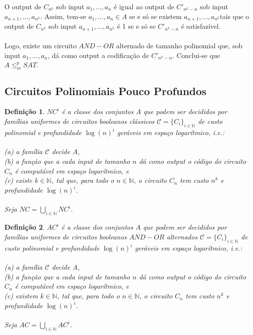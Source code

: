 \documentclass[10pt,a4paper]{report}
\newtheorem{definition}{Definição}
\begin{document}
O output de $C_{n^k}$ sob input $a_1, ..., a_n$ é igual ao output de $C'_{n^k-n}$ sob input $a_{n+1}, ..., a_{n^k}$. Assim, tem-se $a_1, ..., a_n \in A$ se e só se existem $a_{n+1}, ..., a_{n^k}$tais que o output de $C_{n^k}$ sob input $a_{n+1}, ..., a_{n^k}$ é 1 se e só se $C'_{n^k-n}$ é satisfazível.\\
\\
Logo, existe um circuito $AND-OR$ alternado de tamanho polinomial que, sob input $a_1, ..., a_n$, dá como output a codificação de $C'_{n^k-n}$. Conclui-se que $A \leq^p_m SAT$.
\subsection{Circuitos Polinomiais Pouco Profundos}
\begin{definition}
$NC^i$ é a classe dos conjuntos $A$ que podem ser decididos por famílias uniformes de circuitos booleanos clássicos $\mathcal{C} = \{C_i\}_{i\in\mathbb{N}}$ de custo polinomial e profundidade $\log (n)^i$ geráveis em espaço logarítmico, i.e.:\\
\\
(a) a família $\mathcal{C}$ decide $A$, \\
(b) a função que a cada input de tamanho $n$ dá como output o código do circuito $C_n$ é computável em espaço logarítmico, e\\
(c) existe $k \in \mathbb{N}$, tal que, para todo o $n \in \mathbb{N}$, o circuito $C_n$ tem custo $n^k$ e profundidade $\log (n)^i$.\\
\\
Seja $NC = \bigcup_{i \in \mathbb{N}} NC^i$.
\end{definition}
\begin{definition}
$AC^i$ é a classe dos conjuntos $A$ que podem ser decididos por famílias uniformes de circuitos booleanos $AND-OR$ alternados $\mathcal{C} = \{C_i\}_{i\in\mathbb{N}}$ de custo polinomial e profundidade $\log (n)^i$ geráveis em espaço logarítmico, i.e.:\\
\\
(a) a família $\mathcal{C}$ decide A,\\
(b) a função que a cada input de tamanho $n$ dá como output o código do circuito $C_n$ é computável em espaço logarítmico, e\\
(c) existem $k \in \mathbb{N}$, tal que, para todo o $n \in \mathbb{N}$, o circuito $C_n$ tem custo $n^k$ e profundidade $\log (n)^i$.\\
\\
Seja $AC = \bigcup_{i \in \mathbb{N}} AC^i$.
\end{definition}
\end{document}

